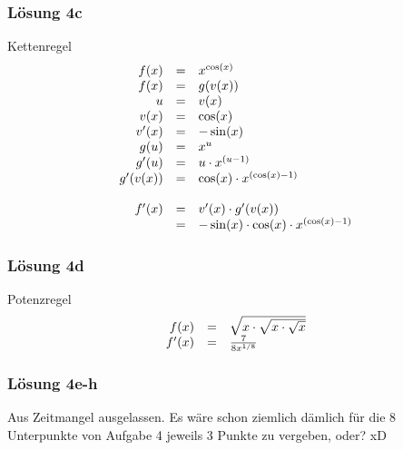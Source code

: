 \documentclass[main.tex]{subfiles}
\begin{document}
\subsubsection{Lösung 4c}
Kettenregel
\begin{equation*}
    \begin{array}{ r c l }
    f( x) & = & x^{\cos (x)}\\
    f( x) & = & g( v( x))\\
    u & = & v( x)\\
    v( x) & = & \cos( x)\\
    v'( x) & = & -\sin( x)\\
    g( u) & = & x^{u}\\
    g'( u) & = & u\cdotp x^{( u-1)}\\
    g'( v( x)) & = & \cos( x) \cdotp x^{(\cos( x) -1)}\\
    &  & \\
    f'( x) & = & v'( x) \cdotp g'( v( x))\\
    & = & -\sin( x) \cdotp \cos( x) \cdotp x^{(\cos( x) -1)}
    \end{array}
\end{equation*}

\subsubsection{Lösung 4d}
Potenzregel
\begin{equation*}
    \begin{array}{ r c l }
    f( x) & = & \sqrt{x\cdotp \sqrt{x\cdotp \sqrt{x}}}\\
    f'( x) & = & \frac{7}{8x^{1/8}}
    \end{array}
\end{equation*}

\subsubsection{Lösung 4e-h}
\textcolor[rgb]{0.55,0.89,0.2}{Aus Zeitmangel ausgelassen. Es wäre schon ziemlich dämlich für die 8 Unterpunkte von Aufgabe 4 jeweils 3 Punkte zu vergeben, oder? xD}
\end{document}

